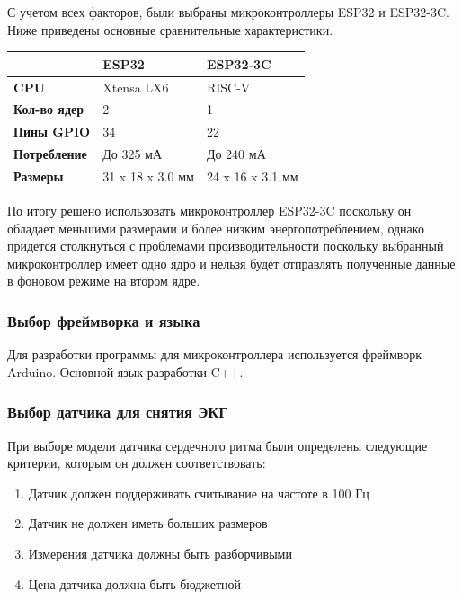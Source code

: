 \documentclass[12pt, russian]{extarticle}
\begin{document}
\begin{spacing}{1.5}
С учетом всех факторов, были выбраны микроконтроллеры ESP32 и ESP32-3C.
Ниже приведены основные сравнительные характеристики. 

\begin{center}
\begin{tabular}{|l|l|l|}
\hline
\textbf{}            & \textbf{ESP32} & \textbf{ESP32-3C} \\ \hline
\textbf{CPU}         & Xtensa LX6                             & RISC-V                                    \\ \hline
\textbf{Кол-во ядер} & 2                                      & 1                                         \\ \hline
\textbf{Пины GPIO}        & 34                                     & 22                                        \\ \hline
\textbf{Потребление} & До 325 мА                              & До 240 мА                                 \\ \hline
\textbf{Размеры}     & 31 x 18 x 3.0 мм                       & 24 x 16 x 3.1 мм                          \\ \hline
\end{tabular}
\end{center}

По итогу решено использовать микроконтроллер ESP32-3C поскольку он обладает меньшими размерами и более низким энергопотреблением, однако придется столкнуться с проблемами производительности поскольку выбранный микроконтроллер имеет одно ядро и нельзя будет отправлять полученные данные в фоновом режиме на втором ядре.

\subsubsection{Выбор фреймворка и языка}

Для разработки программы для микроконтроллера используется фреймворк Arduino. Основной язык разработки C++.

\subsubsection{Выбор датчика для снятия ЭКГ}

При выборе модели датчика сердечного ритма были определены следующие критерии, которым он должен соответствовать: 

\begin{enumerate}
    \item Датчик должен поддерживать считывание на частоте в 100 Гц
    \item Датчик не должен иметь больших размеров
    \item Измерения датчика должны быть разборчивыми
    \item Цена датчика должна быть бюджетной
\end{enumerate}


\end{spacing}
\end{document}
